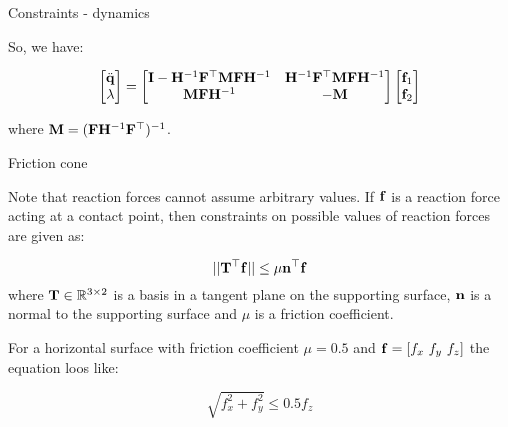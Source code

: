 \documentclass{beamer}
\begin{document}
\begin{frame}{Constraints - dynamics}
	\begin{flushleft}
		
		So, we have:
		
		\begin{equation}
			\begin{bmatrix}
				\ddot{\mathbf{q}} \\
				\lambda
			\end{bmatrix}
		=
		     \begin{bmatrix}
		     	\mathbf{I} - \mathbf{H}^{-1}\mathbf{F}^\top \mathbf{M} \mathbf{F} \mathbf{H}^{-1} &
		     	\mathbf{H}^{-1}\mathbf{F}^\top \mathbf{M} \mathbf{F} \mathbf{H}^{-1} 
		     	\\
		     	\mathbf{M} \mathbf{F} \mathbf{H}^{-1} &
		     	-\mathbf{M}
		     \end{bmatrix}
	     	\begin{bmatrix}
	     \mathbf{f}_1 \\
	     \mathbf{f}_2
     		\end{bmatrix}
		\end{equation}
		
		where $\mathbf{M} =  (\mathbf{F}\mathbf{H}^{-1}\mathbf{F}^\top )^{-1}$.
		
	\end{flushleft}
\end{frame}





\begin{frame}{Friction cone}
	\begin{flushleft}
		
		Note that reaction forces cannot assume arbitrary values. If $\mathbf{f}$ is a reaction force acting at a contact point, then constraints on possible values of reaction forces are given as:
		
		\begin{equation}
			||\mathbf{T}^\top\mathbf{f}|| \leq \mu \mathbf{n}^\top \mathbf{f}
		\end{equation}
		where $\mathbf{T} \in \mathbb{R}^{3 \times 2}$ is a basis in a tangent plane on the supporting surface, $\mathbf{n}$ is a normal to the supporting surface and $\mu$ is a friction coefficient.
		
		\bigskip
		
		For a horizontal surface with friction coefficient $\mu = 0.5$ and $\mathbf{f} = [f_x \ f_y \ f_z]$ the equation loos like:
		
		\begin{equation}
			\sqrt{f_x^2 + f_y^2} \leq 0.5 f_z
		\end{equation}
		
	\end{flushleft}
\end{frame}
\end{document}
